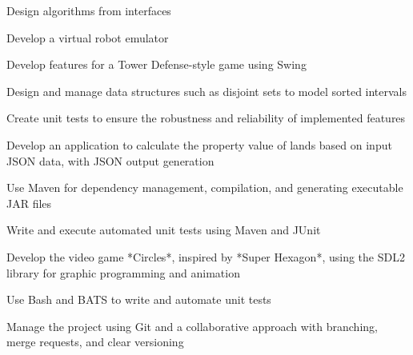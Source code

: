 \documentclass[letterpaper,10pt]{article}
\begin{document}
  \begin{resume_list}
    \item Design algorithms from interfaces
    \vspace{2pt}
    \item Develop a virtual robot emulator
    \vspace{2pt}
    \item Develop features for a Tower Defense-style game using Swing
    \vspace{2pt}
    \item Design and manage data structures such as disjoint sets to model sorted intervals
    \vspace{2pt}
    \item Create unit tests to ensure the robustness and reliability of implemented features
    
  \end{resume_list}

  \begin{resume_list}
    \item Develop an application to calculate the property value of lands based on input JSON data, with JSON output generation
    \vspace{2pt}
    \item Use Maven for dependency management, compilation, and generating executable JAR files
    \vspace{2pt}
    \item Write and execute automated unit tests using Maven and JUnit
  \end{resume_list}
  
  \begin{resume_list}
    \item Develop the video game *Circles*, inspired by *Super Hexagon*, using the SDL2 library for graphic programming and animation
    \vspace{2pt}
    \item Use Bash and BATS to write and automate unit tests
    \vspace{2pt}
    \item Manage the project using Git and a collaborative approach with branching, merge requests, and clear versioning
  \end{resume_list}
  
\end{document}
